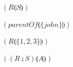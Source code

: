 \documentclass[a4paper,10pt,fleqn]{article}
\begin{document}
\noindent
$(R \limg S \rimg)$


\noindent
$(parentOf \limg \{john\} \rimg)$


\noindent
$(R \limg \{1, 2, 3\} \rimg)$


\noindent
$((R \semi S) \limg A \rimg)$
\end{document}
